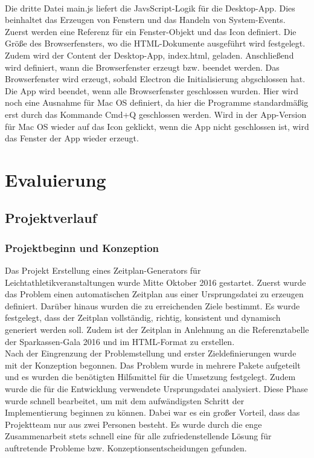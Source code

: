 {\\
Die dritte Datei main.js liefert die JavsScript-Logik für die Desktop-App. Dies beinhaltet das Erzeugen von Fenstern und das Handeln von System-Events. Zuerst werden eine Referenz für ein Fenster-Objekt und das Icon definiert. Die Größe des Browserfensters, wo die HTML-Dokumente ausgeführt wird festgelegt. Zudem wird der Content der Desktop-App, index.html, geladen. Anschließend wird definiert, wann die Browserfenster erzeugt bzw. beendet werden. Das Browserfenster wird erzeugt, sobald Electron die Initialisierung abgschlossen hat. Die App wird beendet, wenn alle Browserfenster geschlossen wurden. Hier wird noch eine Ausnahme für Mac OS definiert, da hier die Programme standardmäßig erst durch das Kommande Cmd+Q geschlossen werden. Wird in der App-Version für Mac OS wieder auf das Icon geklickt, wenn die App nicht geschlossen ist, wird das Fenster der App wieder erzeugt.

\section{Evaluierung}
\subsection{Projektverlauf}
\subsubsection{Projektbeginn und Konzeption}
Das Projekt Erstellung eines Zeitplan-Generators für Leichtathletikveranstaltungen wurde Mitte Oktober 2016 gestartet. Zuerst wurde das Problem einen automatischen Zeitplan aus einer Ursprungsdatei zu erzeugen definiert. Darüber hinaus wurden die zu erreichenden Ziele bestimmt. Es wurde festgelegt, dass der Zeitplan vollständig, richtig, konsistent und dynamisch generiert werden soll. Zudem ist der Zeitplan in Anlehnung an die Referenztabelle der Sparkassen-Gala 2016 und im HTML-Format zu erstellen.\\
Nach der Eingrenzung der Problemstellung und erster Zieldefinierungen wurde mit der Konzeption begonnen. Das Problem wurde in mehrere Pakete aufgeteilt und es wurden die benötigten Hilfsmittel für die Umsetzung festgelegt. Zudem wurde die für die Entwicklung verwendete Ursprungsdatei analysiert.
Diese Phase wurde schnell bearbeitet, um mit dem aufwändigsten Schritt der Implementierung beginnen zu können. Dabei war es ein großer Vorteil, dass das Projektteam nur aus zwei Personen besteht. Es wurde durch die enge Zusammenarbeit stets schnell eine für alle zufriedenstellende Lösung für auftretende Probleme bzw. Konzeptionsentscheidungen gefunden.

}
